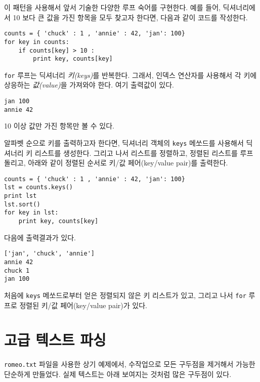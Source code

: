 
이 패턴을 사용해서 앞서 기술한 다양한 루프 숙어를 구현한다.
예를 들어, 딕셔너리에서 10 보다 큰 값을 가진 항목을 모두 찾고자 한다면, 다음과 같이 코드를 작성한다.

\beforeverb
\begin{verbatim}
counts = { 'chuck' : 1 , 'annie' : 42, 'jan': 100}
for key in counts:
    if counts[key] > 10 :
        print key, counts[key]
\end{verbatim}
\afterverb
%

{\tt for} 루프는 딕셔너리 {\em 키(keys)}를 반복한다. 
그래서, 인덱스 연산자를 사용해서 각 키에 상응하는 {\em 값(value)}을 가져와야 한다.
여기 출력값이 있다.

\beforeverb
\begin{verbatim}
jan 100
annie 42
\end{verbatim}
\afterverb
%

10 이상 값만 가진 항목만 볼 수 있다.


알파벳 순으로 키를 출력하고자 한다면, 딕셔너리 객체의 {\tt keys} 메쏘드를 사용해서 딕셔너리 키 리스트를 생성한다.
그리고 나서 리스트를 정렬하고, 정렬된 리스트를 루프 돌리고, 아래와 같이 정렬된 순서로 키/값 페어(key/value pair)를 출력한다.

\beforeverb
\begin{verbatim}
counts = { 'chuck' : 1 , 'annie' : 42, 'jan': 100}
lst = counts.keys()
print lst
lst.sort()
for key in lst:
    print key, counts[key]
\end{verbatim}
\afterverb
%

다음에 출력결과가 있다.

\beforeverb
\begin{verbatim}
['jan', 'chuck', 'annie']
annie 42
chuck 1
jan 100
\end{verbatim}
\afterverb
%

처음에 {\tt keys} 메쏘드로부터 얻은 정렬되지 않은 키 리스트가 있고, 
그리고 나서 {\tt for} 루프로 정렬된 키/값 페어(key/value pair)가 있다.

\section{고급 텍스트 파싱}


{\tt romeo.txt} 파일을 사용한 상기 예제에서, 수작업으로 모든 구두점을 제거해서 가능한 단순하게 만들었다.
실제 텍스트는 아래 보여지는 것처럼 많은 구두점이 있다.

